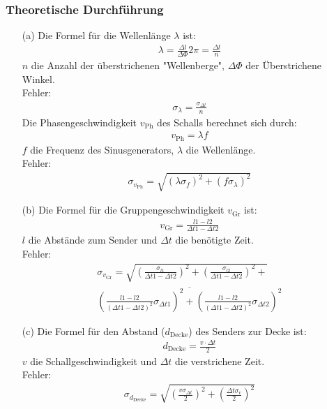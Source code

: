 \documentclass[12pt]{scrartcl}
\begin{document}
\subsubsection{Theoretische Durchführung}
\begin{enumerate}
\item[(a)]
Die Formel für die Wellenlänge $\lambda$ ist:
\begin{align}
\lambda = \frac{\Delta l}{\Delta \Phi} 2\pi
= \frac{\Delta l}{n}
\label{eqn:lamda_1}
\end{align}
$n$ die Anzahl der überstrichenen "Wellenberge", $\Delta \Phi$ der Überstrichene Winkel.\\
Fehler:
\begin{align}
\sigma_{\lambda} = \frac{\sigma_{\Delta l}}{n}
\label{eqn:lamda_1_sigma}
\end{align}
Die Phasengeschwindigkeit $v_{\text{Ph}}$ des Schalls berechnet sich durch:
\begin{align}
v_{\text{Ph}} = \lambda f
\label{eqn:v}
\end{align}
$f$ die Frequenz des Sinusgenerators, $\lambda$ die Wellenlänge.\\
Fehler:
\begin{align}
\sigma_{v_{\text{Ph}}} = \sqrt{
\left(\lambda \sigma_f\right)^2+
\left(f \sigma_{\lambda}\right)^2}
\label{eqn:v_sigam}
\end{align}
\item[(b)]
Die Formel für die Gruppengeschwindigkeit $v_{\text{Gr}}$ ist:
\begin{align}
v_{\text{Gr}} = \frac{l1-l2}{\Delta t1 - \Delta t2}
\label{eqn:v_gr}
\end{align}
$l$ die Abstände zum Sender und $\Delta t$ die benötigte Zeit.\\
Fehler:
\begin{equation}
\begin{split}
\sigma_{v_{\text{Gr}}} = \sqrt{
\left(\frac{\sigma_{l1}}{\Delta t1 - \Delta t2}\right)^2+
\left(\frac{\sigma_{l2}}{\Delta t1 - \Delta t2}\right)^2+}\\
\overline{\left(\frac{l1-l2}{(\Delta t1 - \Delta t2)^2}\sigma_{\Delta t1}
\right)^2+
\left(\frac{l1-l2}{(\Delta t1 - \Delta t2)^2}\sigma_{\Delta t2}\right)^2}
\end{split}
\label{eqn:v_gr_sigma}
\end{equation}
\item[(c)]
Die Formel für den Abstand ($d_{\text{Decke}}$) des Senders zur Decke ist:
\begin{align}
d_{\text{Decke}} = \frac{v \cdot \Delta t}{2}
\label{eqn:decke}
\end{align}
$v$ die Schallgeschwindigkeit und $\Delta t$ die verstrichene Zeit.\\
Fehler:
\begin{align}
\sigma_{d_{\text{Decke}}} = \sqrt{
\left(\frac{v \sigma_{\Delta t}}{2}\right)^2+
\left(\frac{\Delta t \sigma_v}{2}\right)^2}
\label{eqn:decke_sigma}
\end{align}
\end{enumerate}
\end{document}
